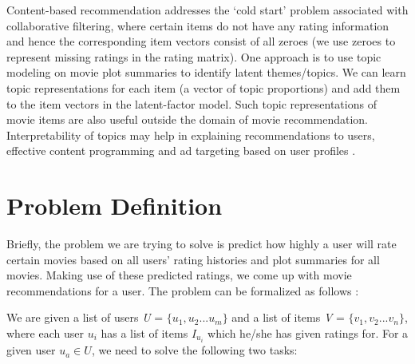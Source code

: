 \documentclass{article} %
\begin{document}
Content-based recommendation addresses the `cold start' problem associated with 
collaborative filtering, where certain items do not have any rating information 
and hence the corresponding item vectors consist of all zeroes (we use 
zeroes to represent missing ratings in the rating matrix). One approach is to 
use topic modeling on movie plot summaries to identify latent themes/topics. We 
can learn topic representations for each item (a vector of topic proportions) 
and add them to the item vectors in the latent-factor model. Such topic 
representations of movie items are also useful outside the domain
of movie recommendation. Interpretability of topics may help in explaining 
recommendations to users, effective content programming and ad targeting based
on user profiles \cite{fLDA}. 
 


\section{Problem Definition}

Briefly, the problem we are trying to solve is predict how highly a user will 
rate certain movies based on all users' rating histories and plot summaries for 
all movies. Making use of these predicted ratings, we come up with movie 
recommendations for a user. The problem can be formalized as follows 
\cite{grouplens} :

We are given a list of users \textit{U} = $\{u_{1}, u_{2} ... u_{m}\}$ and a 
list of items \textit{V} = $\{v_{1}, v_{2} ... v_{n}\}$, where each user $u_{i}$
has a list of items $I_{u_{i}}$ which he/she has given ratings for. For a given
user $u_{a} \in \textit{U}$, we need to solve the following two tasks:
\end{document}
